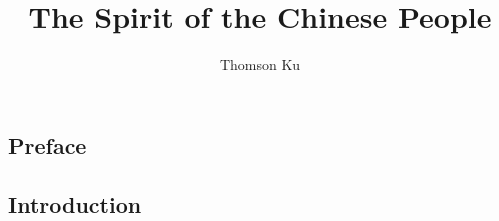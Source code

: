 \documentclass{PT3}
\newcommand{\doctitle}{The Spirit of the Chinese People}
\newcommand{\docauthor}{Thomson Ku}
\newcommand{\docsubject}{}
\newcommand{\doctitle}{春秋大義}
\newcommand{\docauthor}{辜鴻銘}
\newcommand{\docsubject}{中國人的精神}
\theoremstyle{plain}%
\theoremstyle{definition}
\theoremstyle{remark}
\begin{document}
  \title[\docsubject]{\doctitle}
  \author{\docauthor}


  \frontmatter
  \maketitle
  \tableofcontents


  \begin{preface}
    \chapter*{Preface}
    
  \end{preface}

  \mainmatter

  \begin{introduction}
    \chapter*{Introduction}
    
  \end{introduction}
    
    
    
    
    
    
    

  \backmatter

  \appendix
    
    
  \endappendix

  \theendnotes

  \label{refs}
  

  \cleardoublepage




\end{document}
